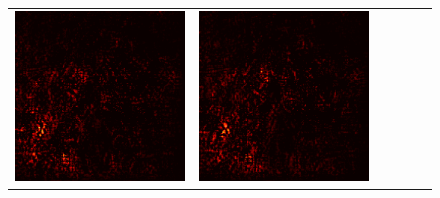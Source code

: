 \documentclass[preprint,12pt]{elsarticle}
\begin{document}
\begin{figure}[p]
\begin{tabular}{cccccc}
  \includegraphics[scale=\scale]{../visualizations/examples/imagenette/resnet18/active_saliency_map/4.png} & 
  \includegraphics[scale=\scale]{../visualizations/examples/imagenette/resnet18/inactive_saliency_map/4.png} \\
  

\end{tabular}
\end{figure}
\end{document}

